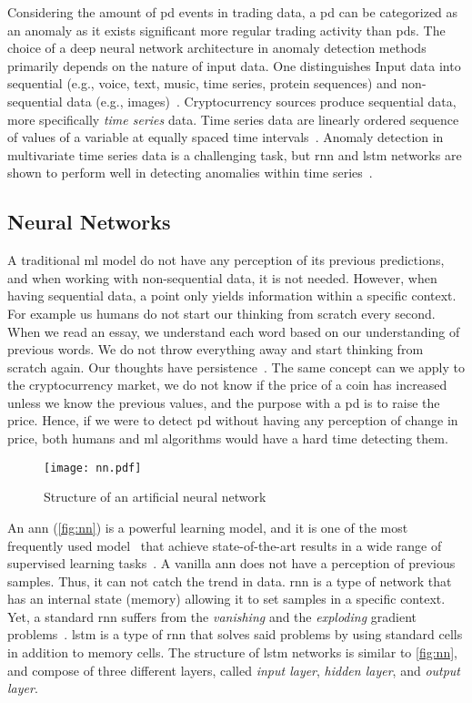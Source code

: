 Considering the amount of \ac{pd} events in trading data, a \ac{pd} can be categorized as an anomaly as it exists significant more regular trading activity than \acp{pd}. The choice of a deep neural network architecture in anomaly detection methods primarily depends on the nature of input data. One distinguishes Input data into sequential (e.g., voice, text, music, time series, protein sequences) and non-sequential data (e.g., images)~\cite{dl_anomaly}. Cryptocurrency sources produce sequential data, more specifically \emph{time series} data. Time series data are linearly ordered sequence of values of a variable at equally spaced time intervals~\cite{stat_handbook}. Anomaly detection in multivariate time series data is a challenging task, but \ac{rnn} and \ac{lstm} networks are shown to perform well in detecting anomalies within time series~\cite{dl_anomaly}.

\subsection{Neural Networks}\label{sec:nn}
A traditional \ac{ml} model do not have any perception of its previous predictions, and when working with non-sequential data, it is not needed. However, when having sequential data, a point only yields information within a specific context. For example us humans do not start our thinking from scratch every second. When we read an essay, we understand each word based on our understanding of previous words. We do not throw everything away and start thinking from scratch again. Our thoughts have persistence~\cite{colah}. The same concept can we apply to the cryptocurrency market, we do not know if the price of a coin has increased unless we know the previous values, and the purpose with a \ac{pd} is to raise the price. Hence, if we were to detect \ac{pd} without having any perception of change in price, both humans and \ac{ml} algorithms would have a hard time detecting them.

\begin{figure}
    \centering
    \texttt{[image: nn.pdf]}
    \caption{Structure of an artificial neural network}
    \label{fig:nn}
\end{figure}

An \ac{ann} (\autoref{fig:nn}) is a powerful learning model, and it is one of the most frequently used model~\cite{hunt1992neural} that achieve state-of-the-art results in a wide range of supervised learning tasks~\cite{lipton2015critical}. A vanilla \ac{ann} does not have a perception of previous samples. Thus, it can not catch the trend in data. \ac{rnn} is a type of network that has an internal state (memory) allowing it to set samples in a specific context. Yet, a standard \ac{rnn} suffers from the \emph{vanishing} and the \emph{exploding} gradient problems~\cite{bengio1994learning}. \ac{lstm} is a type of \ac{rnn} that solves said problems by using standard cells in addition to memory cells. The structure of \ac{lstm} networks is similar to \autoref{fig:nn}, and compose of three different layers, called \emph{input layer}, \emph{hidden layer}, and \emph{output layer}.

